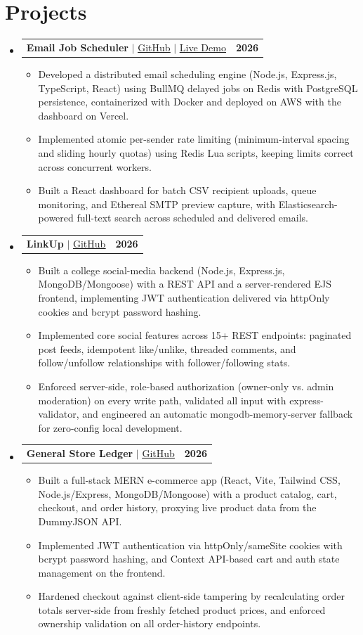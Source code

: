 \documentclass[letterpaper,10pt]{article}
\makeatletter
\newcommand{\resumeItem}[1]{
  \item\small{
    {#1 \vspace{-2pt}}
  }
}
\newcommand{\resumeProjectHeading}[2]{
    \item
    \begin{tabular*}{1.001\textwidth}{l@{\extracolsep{\fill}}r}
      \small#1 & \textbf{\small #2}\\
    \end{tabular*}\vspace{-7pt}
}
\newcommand{\resumeSubHeadingListStart}{\begin{itemize}[leftmargin=0.0in, label={}]}
\newcommand{\resumeSubHeadingListEnd}{\end{itemize}}
\newcommand{\resumeItemListStart}{\begin{itemize}}
\newcommand{\resumeItemListEnd}{\end{itemize}\vspace{-5pt}}
\makeatother
\begin{document}
\section{Projects}
    \vspace{-5pt}
    \resumeSubHeadingListStart
\resumeProjectHeading
    {\textbf{Email Job Scheduler} $|$ \href{https://github.com/vaibhv19/Email-Job-Scheduler}{\underline{GitHub}} $|$ \href{https://email-job-scheduler.vaibhv19.dev}{\underline{Live Demo}}}{2026}
    \resumeItemListStart
        \resumeItem{Developed a distributed email scheduling engine (Node.js, Express.js, TypeScript, React) using BullMQ delayed jobs on Redis with PostgreSQL persistence, containerized with Docker and deployed on AWS with the dashboard on Vercel.}
        \resumeItem{Implemented atomic per-sender rate limiting (minimum-interval spacing and sliding hourly quotas) using Redis Lua scripts, keeping limits correct across concurrent workers.}
        \resumeItem{Built a React dashboard for batch CSV recipient uploads, queue monitoring, and Ethereal SMTP preview capture, with Elasticsearch-powered full-text search across scheduled and delivered emails.}
    \resumeItemListEnd
          \vspace{-13pt}
\resumeProjectHeading
    {\textbf{LinkUp} $|$ \href{https://github.com/vaibhv19/LinkUp}{\underline{GitHub}}}{2026}
    \resumeItemListStart
        \resumeItem{Built a college social-media backend (Node.js, Express.js, MongoDB/Mongoose) with a REST API and a server-rendered EJS frontend, implementing JWT authentication delivered via httpOnly cookies and bcrypt password hashing.}
        \resumeItem{Implemented core social features across 15+ REST endpoints: paginated post feeds, idempotent like/unlike, threaded comments, and follow/unfollow relationships with follower/following stats.}
        \resumeItem{Enforced server-side, role-based authorization (owner-only vs. admin moderation) on every write path, validated all input with express-validator, and engineered an automatic mongodb-memory-server fallback for zero-config local development.}
    \resumeItemListEnd
          \vspace{-13pt}
\resumeProjectHeading
    {\textbf{General Store Ledger} $|$ \href{https://github.com/vaibhv19/general-store-ledger}{\underline{GitHub}}}{2026}
    \resumeItemListStart
        \resumeItem{Built a full-stack MERN e-commerce app (React, Vite, Tailwind CSS, Node.js/Express, MongoDB/Mongoose) with a product catalog, cart, checkout, and order history, proxying live product data from the DummyJSON API.}
        \resumeItem{Implemented JWT authentication via httpOnly/sameSite cookies with bcrypt password hashing, and Context API-based cart and auth state management on the frontend.}
        \resumeItem{Hardened checkout against client-side tampering by recalculating order totals server-side from freshly fetched product prices, and enforced ownership validation on all order-history endpoints.}
    \resumeItemListEnd
    \resumeSubHeadingListEnd
\vspace{-12pt}
\end{document}
